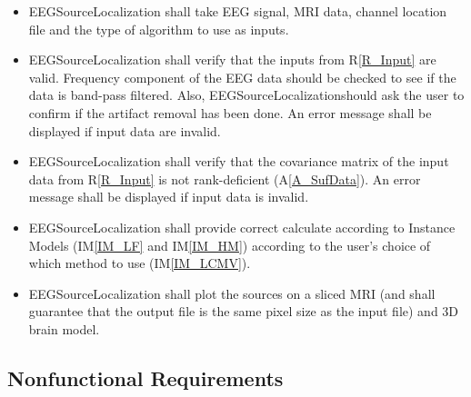 \documentclass[12pt]{article}
\newcommand{\aref}[1]{A\ref{#1}}
\newcommand{\iref}[1]{IM\ref{#1}}
\newcounter{reqnum} %
\newcommand{\rref}[1]{R\ref{#1}}
\renewcommand{\progname}{EEGSourceLocalization}
\begin{document}
\noindent \begin{itemize}

\item[R\refstepcounter{reqnum}\thereqnum \label{R_Input}:]  \progname{} shall take EEG signal, MRI data, channel location file and the type of algorithm to use as inputs. 

\item[R\refstepcounter{reqnum}\thereqnum \label{R_InpVal}:]  \progname{} shall verify that the inputs from \rref{R_Input} are valid. Frequency component of the EEG data should be checked to see if the data is band-pass filtered. Also, \progname should ask the user to confirm if the artifact removal has been done. An error message shall be displayed if input data are invalid.
\item[R\refstepcounter{reqnum}\thereqnum \label{R_Cov}:]  \progname{} shall verify that the covariance matrix of the input data from  \rref{R_Input}  is not rank-deficient (\aref{A_SufData}).  An error message shall be displayed if input data is invalid.


\item[R\refstepcounter{reqnum}\thereqnum \label{R_Calc}:] \progname{} shall provide correct calculate according to Instance Models (\iref{IM_LF} and \iref{IM_HM}) according to the user’s choice of which method to use (\iref{IM_LCMV}).


\item[R\refstepcounter{reqnum}\thereqnum \label{R_Output}:] \progname{} shall plot the sources on a sliced MRI (and shall guarantee that the output file is the same pixel size as the input file) and 3D brain model.

\end{itemize}

\subsection{Nonfunctional Requirements}
\end{document}

